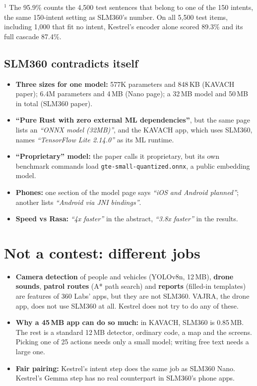 \documentclass[11pt,a4paper]{article}
\newcommand{\quoted}[1]{\textit{``#1''}}
\begin{document}
{\small\color{note}\noindent$^{1}$ The 95.9\% counts the 4,500 test sentences that belong to one of the 150 intents,
the same 150-intent setting as SLM360's number. On all 5,500 test items, including 1,000 that fit no intent, Kestrel's
encoder alone scored 89.3\% and its full cascade 87.4\%.\par}

\subsection*{SLM360 contradicts itself}

\begin{itemize}
  \item \textbf{Three sizes for one model:} 577K parameters and 848\,KB (KAVACH paper); 6.4M parameters and 4\,MB (Nano
  page); a 32\,MB model and 50\,MB in total (SLM360 paper).
  \item \textbf{``Pure Rust with zero external ML dependencies''}, but the same page lists an \quoted{ONNX model
  (32MB)}, and the KAVACH app, which uses SLM360, names \quoted{TensorFlow Lite 2.14.0} as its ML runtime.
  \item \textbf{``Proprietary'' model:} the paper calls it proprietary, but its own benchmark commands load
  \texttt{gte-small-quantized.onnx}, a public embedding model.
  \item \textbf{Phones:} one section of the model page says \quoted{iOS and Android planned}; another lists
  \quoted{Android via JNI bindings}.
  \item \textbf{Speed vs Rasa:} \quoted{4x faster} in the abstract, \quoted{3.8x faster} in the results.
\end{itemize}

\section{Not a contest: different jobs}

\begin{itemize}
  \item \textbf{Camera detection} of people and vehicles (YOLOv8n, 12\,MB), \textbf{drone sounds}, \textbf{patrol
  routes} (A* path search) and \textbf{reports} (filled-in templates) are features of 360 Labs' apps, but they are not
  SLM360. VAJRA, the drone app, does not use SLM360 at all. Kestrel does not try to do any of these.
  \item \textbf{Why a 45\,MB app can do so much:} in KAVACH, SLM360 is 0.85\,MB. The rest is a standard 12\,MB
  detector, ordinary code, a map and the screens. Picking one of 25 actions needs only a small model; writing free text
  needs a large one.
  \item \textbf{Fair pairing:} Kestrel's intent step does the same job as SLM360 Nano. Kestrel's Gemma step has no
  real counterpart in SLM360's phone apps.
\end{itemize}
\end{document}
